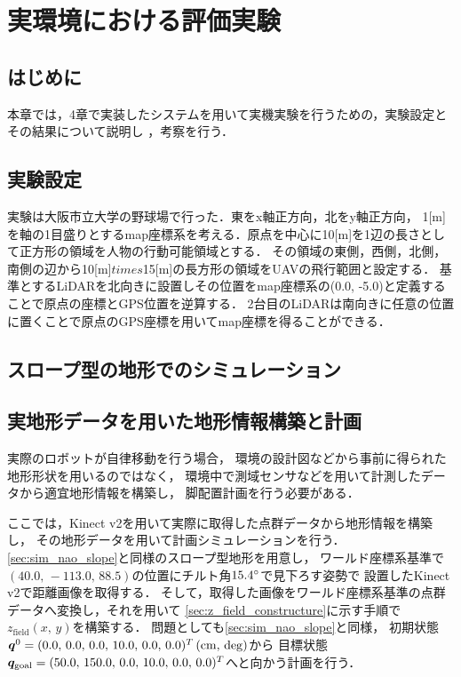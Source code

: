\documentclass[autodetect-engine,dvipdfmx-if-dvi,ja=standard,a4j,jbase=11pt,magstyle=nomag*]{bxjsreport}
\begin{document}
\chapter[実環境における評価実験]{実環境における評価実験}
\label{chap:sim_nao}


\section{はじめに}
本章では，4章で実装したシステムを用いて実機実験を行うための，実験設定とその結果について説明し
，考察を行う．



\section{実験設定}
実験は大阪市立大学の野球場で行った．東をx軸正方向，北をy軸正方向，
1[m]を軸の1目盛りとするmap座標系を考える．原点を中心に10[m]を1辺の長さとして正方形の領域を人物の行動可能領域とする．
その領域の東側，西側，北側，南側の辺から10[m]$times$15[m]の長方形の領域をUAVの飛行範囲と設定する．
基準とするLiDARを北向きに設置しその位置をmap座標系の(0.0, -5.0)と定義することで原点の座標とGPS位置を逆算する．
2台目のLiDARは南向きに任意の位置に置くことで原点のGPS座標を用いてmap座標を得ることができる．



\section{スロープ型の地形でのシミュレーション}

\section{実地形データを用いた地形情報構築と計画}
実際のロボットが自律移動を行う場合，
環境の設計図などから事前に得られた地形形状を用いるのではなく，
環境中で測域センサなどを用いて計測したデータから適宜地形情報を構築し，
脚配置計画を行う必要がある．

ここでは，Kinect v2を用いて実際に取得した点群データから地形情報を構築し，
その地形データを用いて計画シミュレーションを行う．
\cref{sec:sim_nao_slope}と同様のスロープ型地形を用意し，
ワールド座標系基準で$(40.0 ,\, -113.0 ,\, 88.5)$の位置にチルト角$15.4\degree$で見下ろす姿勢で
設置したKinect v2で距離画像を取得する．
そして，取得した画像をワールド座標系基準の点群データへ変換し，それを用いて
\cref{sec:z_field_constructure}に示す手順で$z_\mathrm{field}(x ,\, y)$を構築する．
問題としても\cref{sec:sim_nao_slope}と同様，
初期状態$\bm{q}^0 = ( 0.0 ,\, 0.0 ,\, 0.0 ,\, 10.0 ,\, 0.0 ,\, 0.0 )^T\,(\si{\centi\meter} ,\, \mathrm{deg})$から
目標状態$\bm{q}_{\mathrm{goal}} = ( 50.0 ,\, 150.0 ,\, 0.0 ,\, 10.0 ,\, 0.0 ,\, 0.0 )^T$へと向かう計画を行う．
\end{document}
